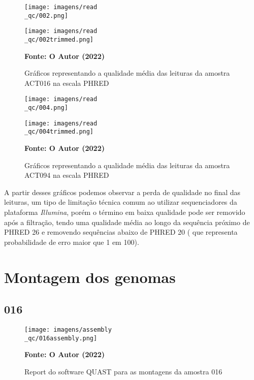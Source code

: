 \begin{figure}[H]
	\caption{Gráficos representando a qualidade média das leituras da amostra ACT016 na escala PHRED}
	\label{fig:fastqc_antes}
	\centering
	\begin{minipage}{.45\linewidth}
		\texttt{[image: imagens/read\\\_qc/002.png]}
	  \end{minipage}
	  \hspace{.05\linewidth}
	  \begin{minipage}{.45\linewidth}
		\texttt{[image: imagens/read\\\_qc/002trimmed.png]}
	  \end{minipage}
    \begin{small}\textbf{Fonte: O Autor (2022)}\end{small}
\end{figure}
\vspace{\floatsep}
\begin{figure}[H]
	\caption{Gráficos representando a qualidade média das leituras da amostra ACT094 na escala PHRED}
	\label{fig:fastqc_antes}
	\centering
	\begin{minipage}{.45\linewidth}
		\texttt{[image: imagens/read\\\_qc/004.png]}
	  \end{minipage}
	  \hspace{.01\linewidth}
	  \begin{minipage}{.45\linewidth}
		\texttt{[image: imagens/read\\\_qc/004trimmed.png]}
	  \end{minipage}
    \begin{small}\textbf{Fonte: O Autor (2022)}\end{small}
\end{figure}
\vspace{\floatsep}

A partir desses gráficos podemos observar a perda de qualidade no final das leituras, um tipo de limitação
técnica comum ao utilizar sequenciadores da plataforma \textit{Illumina}, porém o término em baixa qualidade
pode ser removido após a filtração, tendo uma qualidade média ao longo da sequência próximo de PHRED 26 e
removendo sequências abaixo de PHRED 20 ( que representa probabilidade de erro maior que 1 em 100).


\section{Montagem dos genomas}

\subsection{016}
\begin{figure}[H]
	\caption{Report do software QUAST para as montagens da amostra 016}
	\label{fig:quast_16}
	\centering
		\texttt{[image: imagens/assembly\\\_qc/016assembly.png]}
    \begin{small}\textbf{Fonte: O Autor (2022)}\end{small}
\end{figure}
\vspace{\floatsep}

